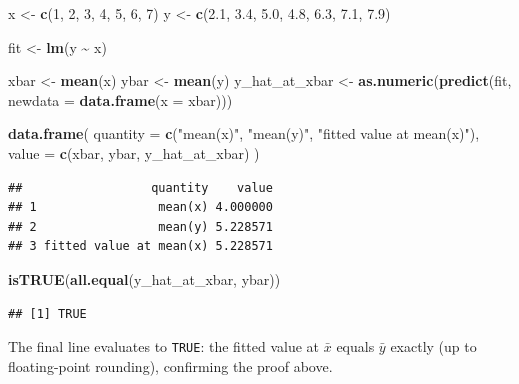 \documentclass[
  11pt,
]{article}
\newenvironment{Shaded}{\begin{snugshade}}{\end{snugshade}}
\newcommand{\AttributeTok}[1]{\textcolor[rgb]{0.13,0.29,0.53}{#1}}
\newcommand{\DecValTok}[1]{\textcolor[rgb]{0.00,0.00,0.81}{#1}}
\newcommand{\FloatTok}[1]{\textcolor[rgb]{0.00,0.00,0.81}{#1}}
\newcommand{\FunctionTok}[1]{\textcolor[rgb]{0.13,0.29,0.53}{\textbf{#1}}}
\newcommand{\NormalTok}[1]{#1}
\newcommand{\OtherTok}[1]{\textcolor[rgb]{0.56,0.35,0.01}{#1}}
\newcommand{\SpecialCharTok}[1]{\textcolor[rgb]{0.81,0.36,0.00}{\textbf{#1}}}
\newcommand{\StringTok}[1]{\textcolor[rgb]{0.31,0.60,0.02}{#1}}
\begin{document}
\begin{Shaded}
\begin{Highlighting}[]
\NormalTok{x }\OtherTok{\textless{}{-}} \FunctionTok{c}\NormalTok{(}\DecValTok{1}\NormalTok{, }\DecValTok{2}\NormalTok{, }\DecValTok{3}\NormalTok{, }\DecValTok{4}\NormalTok{, }\DecValTok{5}\NormalTok{, }\DecValTok{6}\NormalTok{, }\DecValTok{7}\NormalTok{)}
\NormalTok{y }\OtherTok{\textless{}{-}} \FunctionTok{c}\NormalTok{(}\FloatTok{2.1}\NormalTok{, }\FloatTok{3.4}\NormalTok{, }\FloatTok{5.0}\NormalTok{, }\FloatTok{4.8}\NormalTok{, }\FloatTok{6.3}\NormalTok{, }\FloatTok{7.1}\NormalTok{, }\FloatTok{7.9}\NormalTok{)}

\NormalTok{fit }\OtherTok{\textless{}{-}} \FunctionTok{lm}\NormalTok{(y }\SpecialCharTok{\textasciitilde{}}\NormalTok{ x)}

\NormalTok{xbar }\OtherTok{\textless{}{-}} \FunctionTok{mean}\NormalTok{(x)}
\NormalTok{ybar }\OtherTok{\textless{}{-}} \FunctionTok{mean}\NormalTok{(y)}
\NormalTok{y\_hat\_at\_xbar }\OtherTok{\textless{}{-}} \FunctionTok{as.numeric}\NormalTok{(}\FunctionTok{predict}\NormalTok{(fit, }\AttributeTok{newdata =} \FunctionTok{data.frame}\NormalTok{(}\AttributeTok{x =}\NormalTok{ xbar)))}

\FunctionTok{data.frame}\NormalTok{(}
  \AttributeTok{quantity =} \FunctionTok{c}\NormalTok{(}\StringTok{"mean(x)"}\NormalTok{, }\StringTok{"mean(y)"}\NormalTok{, }\StringTok{"fitted value at mean(x)"}\NormalTok{),}
  \AttributeTok{value    =} \FunctionTok{c}\NormalTok{(xbar, ybar, y\_hat\_at\_xbar)}
\NormalTok{)}
\end{Highlighting}
\end{Shaded}

\begin{verbatim}
##                  quantity    value
## 1                 mean(x) 4.000000
## 2                 mean(y) 5.228571
## 3 fitted value at mean(x) 5.228571
\end{verbatim}

\begin{Shaded}
\begin{Highlighting}[]
\FunctionTok{isTRUE}\NormalTok{(}\FunctionTok{all.equal}\NormalTok{(y\_hat\_at\_xbar, ybar))}
\end{Highlighting}
\end{Shaded}

\begin{verbatim}
## [1] TRUE
\end{verbatim}

The final line evaluates to \texttt{TRUE}: the fitted value at
\(\bar x\) equals \(\bar y\) exactly (up to floating-point rounding),
confirming the proof above.
\end{document}
